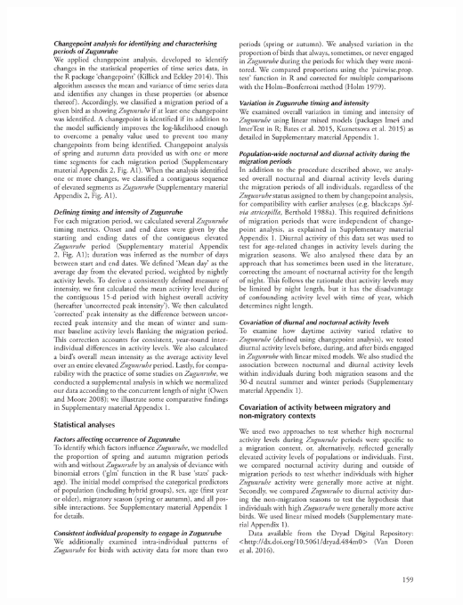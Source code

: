 \documentclass[a4paper, twoside]{templates/ociamthesis}
\begin{document}
\begin{center}\includegraphics[width=1\linewidth]{pdf_chapters/zug/zug_crop_Part05} \end{center}
\end{document}
